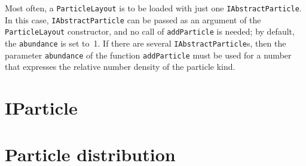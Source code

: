 Most often, a \texttt{ParticleLayout} is to be loaded with just one \texttt{IAbstractParticle}.
In this case, \texttt{IAbstractParticle} can be passed as an argument of the
\texttt{ParticleLayout} constructor,
and no call of \texttt{addParticle} is needed;
by default, the \texttt{abundance} is set to~1.
%
If there are several \texttt{IAbstractParticle}s,
then the parameter \texttt{abundance} of the function \texttt{addParticle} must be used for
a number that expresses the relative number density of the particle kind.


\section{IParticle}\label{SRefIPart}

\MissingSection

\section{Particle distribution}\label{SRefPDis}

\MissingSection
